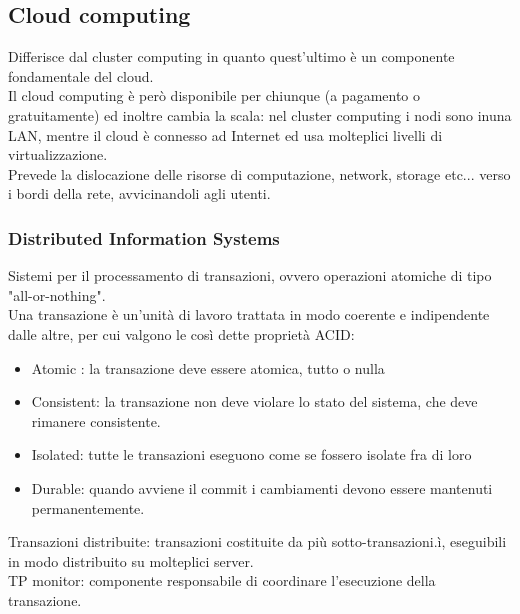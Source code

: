 \documentclass{article}
\begin{document}
\subsection{Cloud computing}
Differisce dal cluster computing in quanto quest'ultimo è un componente fondamentale del cloud.\\ Il cloud computing è però disponibile per chiunque (a pagamento o gratuitamente) ed inoltre cambia la scala: nel cluster computing i nodi sono inuna LAN, mentre il cloud è connesso ad Internet ed usa molteplici livelli di virtualizzazione.\\ Prevede la dislocazione delle risorse di computazione, network, storage etc... verso i bordi della rete, avvicinandoli agli utenti.
\subsubsection{Distributed Information Systems}
Sistemi per il processamento di transazioni, ovvero operazioni atomiche di tipo "all-or-nothing".\\ Una transazione è un'unità di lavoro trattata in modo coerente e indipendente dalle altre, per cui valgono le così dette proprietà ACID:
\begin{itemize}
\item Atomic : la transazione deve essere atomica, tutto o nulla
\item Consistent: la transazione non deve violare lo stato del sistema, che deve rimanere consistente.
\item Isolated: tutte le transazioni eseguono come se fossero isolate fra di loro
\item Durable: quando avviene il commit i cambiamenti devono essere mantenuti permanentemente.
\end{itemize}
Transazioni distribuite: transazioni costituite da più sotto-transazioni.ì, eseguibili in modo distribuito su molteplici server.\\ TP monitor: componente responsabile di coordinare l'esecuzione della transazione.
\end{document}
